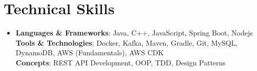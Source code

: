 \section{Technical Skills}
\begin{itemize}[leftmargin=0.15in, label={}]
    \item{
        \textbf{Languages \& Frameworks}{: Java, C++, JavaScript, Spring Boot, Nodejs} \\
        \textbf{Tools \& Technologies}{: Docker, Kafka, Maven, Gradle, Git, MySQL, DynamoDB, AWS (Fundamentals), AWS CDK} \\
        \textbf{Concepts}{: REST API Development, OOP, TDD, Design Patterns}
    }
\end{itemize}

